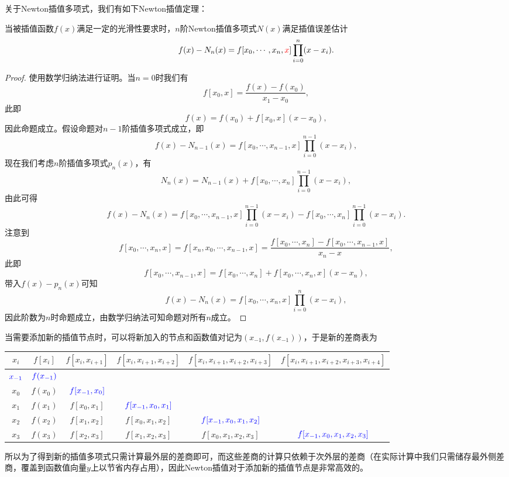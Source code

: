 \documentclass[a4paper,10pt]{ctexart}
\begin{document}
关于Newton插值多项式，我们有如下Newton插值定理：
\begin{theorem}
    当被插值函数$ f(x) $满足一定的光滑性要求时，$ n $阶Newton插值多项式$ N(x) $满足插值误差估计
    \begin{equation}
        f(x)-N_n(x)=f[x_0,\cdots,x_n,\textcolor{red}{x}] \prod_{i=0}^{n}(x-x_i).
    \end{equation}
\end{theorem}
\begin{proof}
    使用数学归纳法进行证明。当$ n=0 $时我们有
    \[
        f[x_0,x] = \frac{f(x)-f(x_0)}{x_1-x_0} ,
    \]
    此即
    \[
        f(x) = f(x_0) + f[x_0,x](x-x_0),
    \]
    因此命题成立。假设命题对$ n-1 $阶插值多项式成立，即
    \[
        f(x)-N_{n-1}(x)=f[x_0,\cdots,x_{n-1},x] \prod_{i=0}^{n-1}(x-x_i),
    \]
    现在我们考虑$ n $阶插值多项式$ p_n(x) $，有
    \[
        N_n(x)=N_{n-1}(x)+f[x_0,\cdots,x_n]\prod_{i=0}^{n-1}(x-x_i),
    \]
    由此可得
    \[
        f(x)-N_n(x)=f[x_0,\cdots,x_{n-1},x]\prod_{i=0}^{n-1}(x-x_i) - f[x_0,\cdots,x_n]\prod_{i=0}^{n-1}(x-x_i).
    \]
    注意到
    \[
        f[x_0,\cdots,x_n,x] = f[x_n,x_0,\cdots,x_{n-1},x] = \frac{f[x_0,\cdots ,x_n]-f[x_0,\cdots ,x_{n-1},x]}{x_n-x},
    \]
    此即
    \[
        f[x_0,\cdots,x_{n-1},x] = f[x_0,\cdots,x_n] + f[x_0,\cdots,x_n,x](x-x_n),
    \]
    带入$ f(x)-p_n(x) $可知
    \[
        f(x)-N_n(x)=f[x_0,\cdots,x_n,x]\prod_{i=0}^{n}(x-x_i),
    \]
    因此阶数为$ n $时命题成立，由数学归纳法可知命题对所有$ n $成立。
\end{proof}

当需要添加新的插值节点时，可以将新加入的节点和函数值对记为$ (x_{-1},f(x_{-1})) $，于是新的差商表为
\begin{center}
    \begin{tabular}{cccccc}
        \toprule
        $x_i$ & $f[x_i]$ & $f[x_i,x_{i+1}]$ & $f[x_i,x_{i+1},x_{i+2}]$ & $f[x_i,x_{i+1},x_{i+2},x_{i+3}]$ & $f[x_i,x_{i+1},x_{i+2},x_{i+3},x_{i+4}]$ \\
        \midrule
        $\textcolor{blue}{x_{-1}}$ & $\textcolor{blue}{f(x_{-1})}$ & & & & \\
        $x_0$ & $f(x_0)$ & $\textcolor{blue}{f[x_{-1},x_0]}$ & & & \\
        $x_1$ & $f(x_1)$ & $f[x_0,x_1]$ & $\textcolor{blue}{f[x_{-1},x_0,x_1]}$ & & \\
        $x_2$ & $f(x_2)$ & $f[x_1,x_2]$ & $f[x_0,x_1,x_2]$ & $\textcolor{blue}{f[x_{-1},x_0,x_1,x_2]}$ & \\
        $x_3$ & $f(x_3)$ & $f[x_2,x_3]$ & $f[x_1,x_2,x_3]$ & $f[x_0,x_1,x_2,x_3]$ & $\textcolor{blue}{f[x_{-1},x_0,x_1,x_2,x_3]}$ \\
        \bottomrule
    \end{tabular}
\end{center}
所以为了得到新的插值多项式只需计算最外层的差商即可，而这些差商的计算只依赖于次外层的差商（在实际计算中我们只需储存最外侧差商，覆盖到函数值向量$ y $上以节省内存占用），因此Newton插值对于添加新的插值节点是非常高效的。
\end{document}
